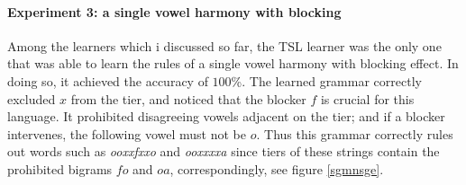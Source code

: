 \paragraph{Experiment 3: a single vowel harmony with blocking}

Among the learners which i discussed so far, the TSL learner was the only one that was able to learn the rules of a single vowel harmony with blocking effect.
In doing so, it achieved the accuracy of $100$\%.
The learned grammar correctly excluded $x$ from the tier, and noticed that the blocker $f$ is crucial for this language.
It prohibited disagreeing vowels adjacent on the tier; and if a blocker intervenes, the following vowel must not be $o$.
Thus this grammar correctly rules out words such as \emph{ooxxfxxo} and \emph{ooxxxxa} since tiers of these strings contain the prohibited bigrams $fo$ and $oa$, correspondingly, see figure \ref{sgmnsge}.

\begin{table}[h!]
\centering
{}
\caption{TSL learning of a single harmony with blockers; abstract representation.}
\end{table}

